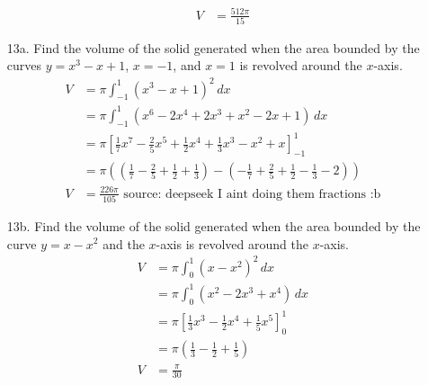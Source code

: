\documentclass[12pt]{article}
\begin{document}
\begin{enumerate}
\begin{align*}
        V&=\frac{512\pi}{15}
    \end{align*}
\pagebreak
    \item[13a.]Find the volume of the solid generated when the area bounded by the curves \( y = x^3 - x + 1 \), \( x = -1 \), and \( x = 1 \) is revolved around the \( x \)-axis.
    \begin{align*}
        V &= \pi \int_{-1}^{1} (x^3 - x + 1)^2 \, dx \\
        &= \pi \int_{-1}^{1} (x^6 - 2x^4 + 2x^3 + x^2 - 2x + 1) \, dx \\
        &= \pi \left[ \frac{1}{7}x^7 - \frac{2}{5}x^5 + \frac{1}{2}x^4 + \frac{1}{3}x^3 - x^2 + x \right]_{-1}^{1} \\
        &= \pi \left( \left( \frac{1}{7} - \frac{2}{5} + \frac{1}{2} + \frac{1}{3} \right) - \left( -\frac{1}{7} + \frac{2}{5} + \frac{1}{2} - \frac{1}{3} - 2 \right) \right) \\
       V &=\frac{226\pi}{105} \text{ source: deepseek I aint doing them fractions :b}
    \end{align*}
    \item[13b.]Find the volume of the solid generated when the area bounded by the curve \( y = x - x^2 \) and the \( x \)-axis is revolved around the \( x \)-axis.
    \begin{align*}
        V&= \pi \int_{0}^{1} (x - x^2)^2 \, dx \\
        &= \pi \int_{0}^{1} (x^2 - 2x^3 + x^4) \, dx \\
        &= \pi \left[ \frac{1}{3}x^3 - \frac{1}{2}x^4 + \frac{1}{5}x^5 \right]_{0}^{1} \\
        &= \pi \left( \frac{1}{3} - \frac{1}{2} + \frac{1}{5} \right) \\
        V&=\frac{\pi}{30}
    \end{align*}
\end{enumerate}

\newpage
\end{document}
